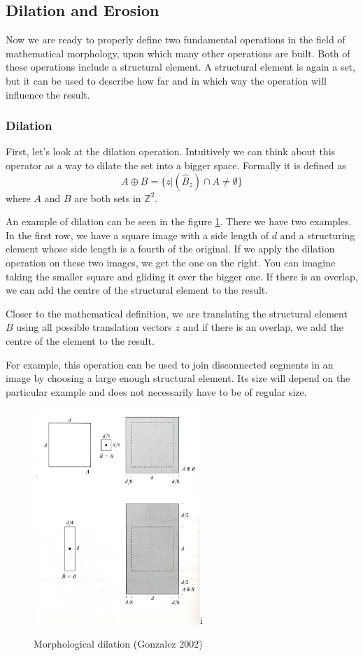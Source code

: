 \documentclass[
  digital,     %
  oneside,     %
  nosansbold,  %
  nocolorbold, %
  lof,         %
  lot,         %
]{fithesis4}
\newcommand*{\Z}{\ensuremath{\mathbb{Z}}}
\begin{document}
\subsection{Dilation and Erosion}
Now we are ready to properly define two fundamental operations in the field of
mathematical morphology, upon which many other operations are built. Both of
these operations include a structural element. A structural element is again a
set, but it can be used to describe how far and in which way the operation will influence the result.


\subsubsection{Dilation}
First, let's look at the dilation operation. Intuitively we can think about this
operator as a way to dilate the set into a bigger space. Formally it is defined
as \parencite{gonzalez2002}
$$A \oplus B = \{z | (\hat{B}_z) \cap A \neq \emptyset\}$$
where $A$ and $B$ are both sets in $\Z^2$. 

An example of dilation can be seen in the figure
\ref{fig:morph_dilation}. There we have two examples. In the first row, we have
a square image with a side length of $d$ and a structuring element whose side length
is a fourth of the original. If we apply the dilation operation on these two
images, we get the one on the right. You can imagine taking the smaller square and
gliding it over the bigger one. If there is an overlap, we can add the centre of
the structural element to the result. 

Closer to the mathematical definition, we
are translating the structural element $B$ using all possible translation
vectors $z$ and if there is an overlap, we add the centre of the element to the
result.

For example, this operation can be used to join disconnected segments in an
image by choosing a large enough structural element. Its size will depend on the
particular example and does not necessarily have to be of regular size.

\begin{figure}
    \begin{center}
        \includegraphics[width=6.3cm]{resources/morph_dilation.jpg}i
    \end{center}
    \caption{Morphological dilation (Gonzalez 2002)} %
    \label{fig:morph_dilation}
\end{figure}
\end{document}
